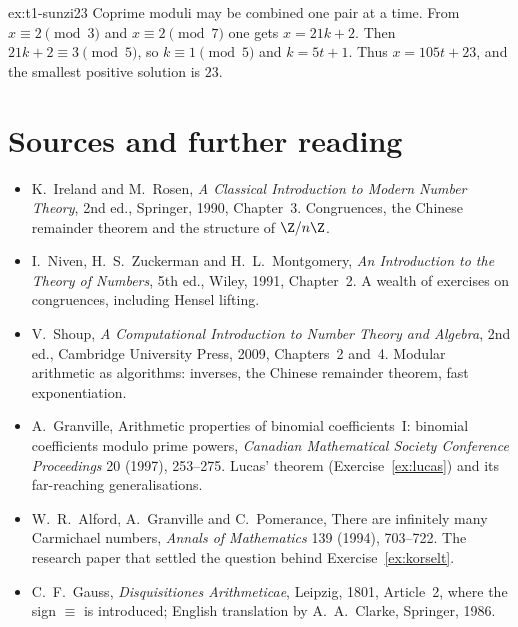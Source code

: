 \begin{solution}{ex:t1-sunzi23}
\idea Coprime moduli may be combined one pair at a time.
\writeup From $x\equiv 2\pmod 3$ and $x\equiv 2\pmod 7$ one gets $x=21k+2$. Then $21k+2\equiv 3\pmod 5$, so $k\equiv 1\pmod 5$ and $k=5t+1$. Thus $x=105t+23$, and the smallest positive solution is $23$.
\end{solution}

\section*{Sources and further reading}

\begin{itemize}
\item K.~Ireland and M.~Rosen, \emph{A Classical Introduction to Modern Number Theory}, 2nd ed., Springer, 1990, Chapter~3. Congruences, the Chinese remainder theorem and the structure of $\Z/n\Z$.
\item I.~Niven, H.~S.~Zuckerman and H.~L.~Montgomery, \emph{An Introduction to the Theory of Numbers}, 5th ed., Wiley, 1991, Chapter~2. A wealth of exercises on congruences, including Hensel lifting.
\item V.~Shoup, \emph{A Computational Introduction to Number Theory and Algebra}, 2nd ed., Cambridge University Press, 2009, Chapters~2 and~4. Modular arithmetic as algorithms: inverses, the Chinese remainder theorem, fast exponentiation.
\item A.~Granville, Arithmetic properties of binomial coefficients~I: binomial coefficients modulo prime powers, \emph{Canadian Mathematical Society Conference Proceedings} 20 (1997), 253--275. Lucas' theorem (Exercise~\ref{ex:lucas}) and its far-reaching generalisations.
\item W.~R.~Alford, A.~Granville and C.~Pomerance, There are infinitely many Carmichael numbers, \emph{Annals of Mathematics} 139 (1994), 703--722. The research paper that settled the question behind Exercise~\ref{ex:korselt}.
\item C.~F.~Gauss, \emph{Disquisitiones Arithmeticae}, Leipzig, 1801, Article~2, where the sign $\equiv$ is introduced; English translation by A.~A.~Clarke, Springer, 1986.
\end{itemize}
